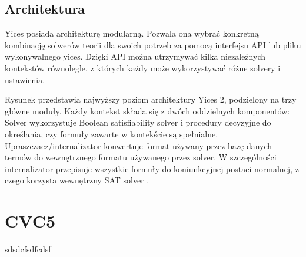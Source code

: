 \subsection{Architektura}
Yices posiada architekturę modularną. Pozwala ona wybrać konkretną kombinację solwerów teorii dla swoich potrzeb za pomocą interfejsu API lub pliku wykonywalnego yices. Dzięki API można utrzymywać kilka niezależnych kontekstów równolegle, z których każdy może wykorzystywać różne solvery i ustawienia.


Rysunek  przedstawia najwyższy poziom architektury Yices 2, podzielony na trzy główne moduły. Każdy kontekst składa się z dwóch oddzielnych komponentów: Solver wykorzystuje Boolean satisfiability solver i procedury decyzyjne do określania, czy formuły zawarte w kontekście są spełnialne. Upraszczacz/internalizator konwertuje format używany przez bazę danych termów do wewnętrznego formatu używanego przez solver. W szczególności
internalizator przepisuje wszystkie formuły do koniunkcyjnej postaci normalnej, z czego korzysta wewnętrzny SAT solver \cite{yices2manual}.

\section{CVC5}
sdsdcfsdfcdsf